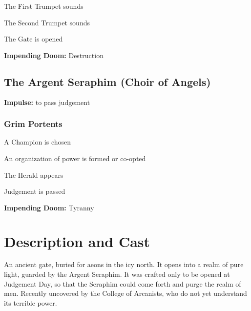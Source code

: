 \startitemize[1,packed]

\item The First Trumpet sounds

 
\item The Second Trumpet sounds

 
\item The Gate is opened


\stopitemize
 

{\bf Impending Doom:}  Destruction

 
\subsection{The Argent Seraphim (Choir of Angels)}      
 

{\bf Impulse:}  to pass judgement

 
\subsubsection{Grim Portents}    
 
\startitemize[1,packed]

\item A Champion is chosen

 
\item An organization of power is formed or co-opted

 
\item The Herald appears

 
\item Judgement is passed


\stopitemize
 

{\bf Impending Doom:}  Tyranny

 
\section{Description and Cast}    
 

An ancient gate, buried for aeons in the icy north. It opens into a realm of pure light, guarded by the Argent Seraphim. It was crafted only to be opened at Judgement Day, so that the Seraphim could come forth and purge the realm of men. Recently uncovered by the College of Arcanists, who do not yet understand its terrible power.

 
\startitemize[1,packed]

